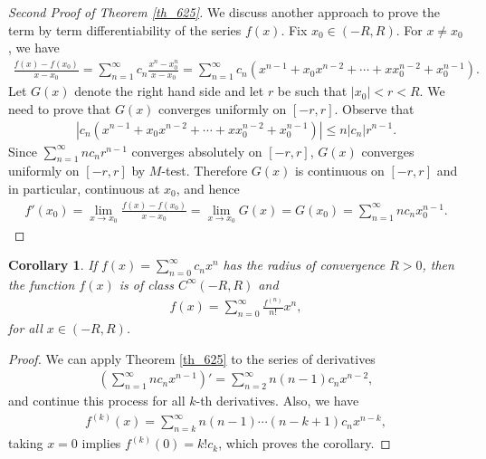 \documentclass[10pt]{book}
\newtheorem{corollary}{Corollary}[theorem]
\theoremstyle{definition}
\numberwithin{equation}{chapter}
\begin{document}
\begin{proof}[Second Proof of Theorem \ref{th_625}]
We discuss another approach to prove the term by term differentiability of the series $f(x)$. Fix $x_0 \in (-R,R)$. For $x \neq x_0$, we have
\begin{align*}
    \frac{f(x) - f(x_0)}{x - x_0} = \sum^\infty_{n=1} c_n \frac{x^n - x_0^n}{x - x_0} = \sum^\infty_{n=1} c_n \left(x^{n-1} + x_0 x^{n-2} + \cdots + x x_0^{n-2} + x_0^{n-1}\right).
\end{align*}
Let $G(x)$ denote the right hand side and let $r$ be such that $\left|x_0\right| < r < R$. We need to prove that $G(x)$ converges uniformly on $[-r,r]$. Observe that
\begin{align*}
    \left|c_n \left(x^{n-1} + x_0 x^{n-2} + \cdots + x x_0^{n-2} + x_0^{n-1}\right)\right| \leq n \left|c_n\right| r^{n-1}.
\end{align*}
Since $\sum^\infty_{n=1} n c_n r^{n-1}$ converges absolutely on $[-r,r]$, $G(x)$ converges uniformly on $[-r,r]$ by $M$-test. Therefore $G(x)$ is continuous on $[-r,r]$ and in particular, continuous at $x_0$, and hence
\begin{align*}
    f'(x_0) = \lim_{x\to x_0} \frac{f(x) - f(x_0)}{x - x_0} = \lim_{x \to x_0} G(x) = G(x_0) = \sum^\infty_{n=1} n c_n x_0^{n-1}.
\end{align*}
\end{proof}

\medskip

\begin{corollary}\label{coro_6251}
If $f(x) = \sum^\infty_{n=0} c_n x^n$ has the radius of convergence $R > 0$, then the function $f(x)$ is of class $C^\infty(-R,R)$ and
\begin{align*}
    f(x) = \sum^\infty_{n=0} \frac{f^{(n)}}{n!} x^n,
\end{align*}
for all $x \in (-R,R)$.
\end{corollary}
\begin{proof}
We can apply Theorem \ref{th_625} to the series of derivatives
\begin{align*}
    \left(\sum^\infty_{n=1} n c_n x^{n-1} \right)' = \sum^\infty_{n=2} n (n-1) c_n x^{n-2},
\end{align*}
and continue this process for all $k$-th derivatives. Also, we have
\begin{align*}
    f^{(k)}(x) = \sum^\infty_{n=k} n (n-1) \cdots (n-k+1) c_n x^{n-k},
\end{align*}
taking $x = 0$ implies $f^{(k)}(0) = k! c_k$, which proves the corollary.
\end{proof}
\end{document}
